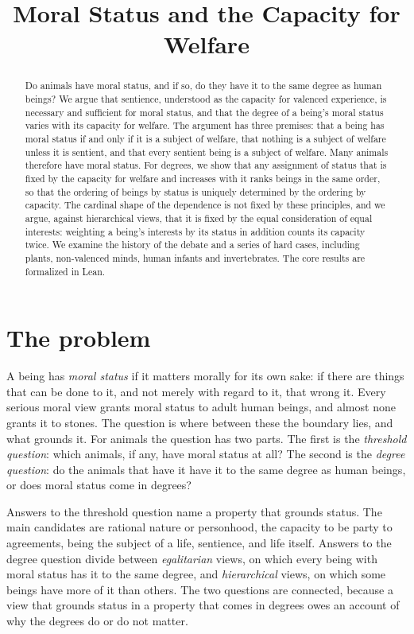 \documentclass{situationist-preprint}
\title{Moral Status and the Capacity for Welfare}
\begin{document}
\maketitle

\begin{abstract}
Do animals have moral status, and if so, do they have it to the same degree as human beings? We argue that sentience, understood as the capacity for valenced experience, is necessary and sufficient for moral status, and that the degree of a being's moral status varies with its capacity for welfare. The argument has three premises: that a being has moral status if and only if it is a subject of welfare, that nothing is a subject of welfare unless it is sentient, and that every sentient being is a subject of welfare. Many animals therefore have moral status. For degrees, we show that any assignment of status that is fixed by the capacity for welfare and increases with it ranks beings in the same order, so that the ordering of beings by status is uniquely determined by the ordering by capacity. The cardinal shape of the dependence is not fixed by these principles, and we argue, against hierarchical views, that it is fixed by the equal consideration of equal interests: weighting a being's interests by its status in addition counts its capacity twice. We examine the history of the debate and a series of hard cases, including plants, non-valenced minds, human infants and invertebrates. The core results are formalized in Lean.
\end{abstract}

\section{The problem}

A being has \emph{moral status} if it matters morally for its own sake: if there are things that can be done to it, and not merely with regard to it, that wrong it. Every serious moral view grants moral status to adult human beings, and almost none grants it to stones. The question is where between these the boundary lies, and what grounds it. For animals the question has two parts. The first is the \emph{threshold question}: which animals, if any, have moral status at all? The second is the \emph{degree question}: do the animals that have it have it to the same degree as human beings, or does moral status come in degrees?

Answers to the threshold question name a property that grounds status. The main candidates are rational nature or personhood, the capacity to be party to agreements, being the subject of a life, sentience, and life itself. Answers to the degree question divide between \emph{egalitarian} views, on which every being with moral status has it to the same degree, and \emph{hierarchical} views, on which some beings have more of it than others. The two questions are connected, because a view that grounds status in a property that comes in degrees owes an account of why the degrees do or do not matter.
\end{document}
